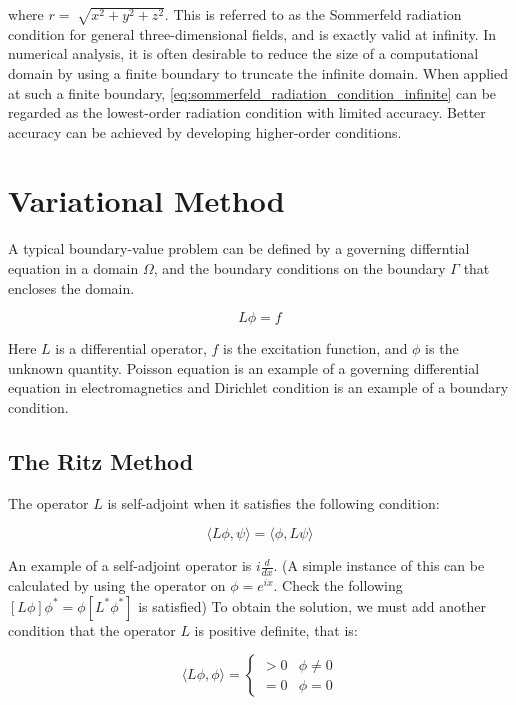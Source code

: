\documentclass[a4paper,12pt]{report}
\begin{document}
where $r = \sqrt[]{x^2 + y^2 + z ^2}$.
This is referred to as the Sommerfeld radiation condition for general three-dimensional fields,
and is exactly valid at infinity.
In numerical analysis,
it is often desirable to reduce the size of a computational domain
by using a finite boundary to truncate the infinite domain.
When applied at such a finite boundary,
\ref{eq:sommerfeld_radiation_condition_infinite} can be regarded as the
lowest-order radiation condition with limited accuracy.
Better accuracy can be achieved by developing higher-order conditions.

\section{Variational Method}

A typical boundary-value problem can be defined by a
governing differntial equation in a domain $\Omega$,
and the boundary conditions on the boundary $\Gamma$ that encloses the domain.

\begin{equation} \label{eq:general_boundary_value_problem}
  L\phi = f
\end{equation}

Here $L$ is a differential operator, $f$ is the excitation function,
and $\phi$ is the unknown quantity.
Poisson equation is an example of a governing differential equation in electromagnetics
and Dirichlet condition is an example of a boundary condition.

\subsection{The Ritz Method}

The operator $L$ is self-adjoint when it satisfies the following condition:

\begin{equation}\label{eq:boundary_problem_differential_equation}
  \langle L\phi, \psi \rangle = \langle\phi, L\psi\rangle
\end{equation}

An example of a self-adjoint operator is $i\frac{d}{dx}$.
(A simple instance of this can be calculated by using the operator
on $\phi = e^{ix}$.
Check the following $[L\phi]\phi^*=\phi [L^*\phi^*]$ is satisfied)
To obtain the solution,
we must add another condition that the operator $L$ is positive definite,
that is:

\begin{equation}
  \langle L\phi, \phi\rangle =
  \begin{cases}
    > 0 & \phi \neq 0 \\
    = 0 & \phi = 0
  \end{cases}
\end{equation}
\end{document}
